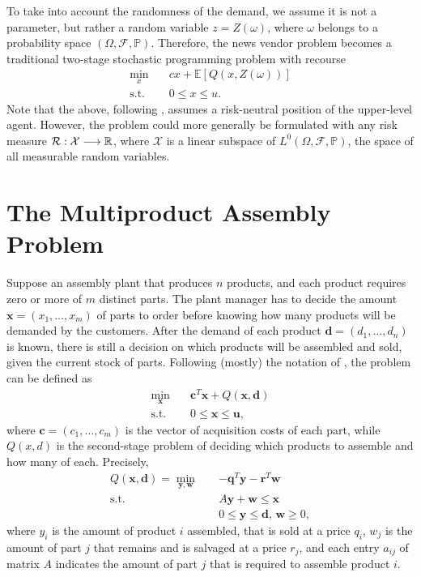 \documentclass[twoside,11pt]{article}
\begin{document}
To take into account the randomness of the demand, we assume it is not a parameter, but rather a random variable $z=Z(\omega)$, where $\omega$ belongs to a probability space $(\Omega,\mathcal{F},\mathbb{P})$.
Therefore, the news vendor problem becomes a traditional two-stage stochastic programming problem with recourse
\begin{align*}
    \min_{x} \quad & cx + \mathbb{E}\left[ Q(x,Z(\omega)) \right]  \\
    \textrm{s.t.} \quad & 0\le x\le u
.\end{align*}
Note that the above, following \citet{birgeIntroductionStochasticProgramming2011}, assumes a risk-neutral position of the upper-level agent.
However, the problem could more generally be formulated with any risk measure $\mathcal{R}: \mathcal{X} \longrightarrow \mathbb{R}$, where $\mathcal{X}$ is a linear subspace of $L^{0}(\Omega, \mathcal{F},\mathbb{P})$, the space of all measurable random variables.


\section*{The Multiproduct Assembly Problem}

Suppose an assembly plant that produces $n$ products, and each product requires zero or more of $m$ distinct parts.
The plant manager has to decide the amount $\bm{x}=(x_1,\ldots,x_{m})$ of parts to order before knowing how many products will be demanded by the customers.
After the demand of each product $\bm{d}=(d_1,\ldots,d_n)$ is known, there is still a decision on which products will be assembled and sold, given the current stock of parts.
Following (mostly) the notation of \citet{shapiroLecturesStochasticProgramming2009}, the problem can be defined as
\begin{align*}
    \min_{\bm{x}} \quad & \bm{c}^{T} \bm{x} + Q(\bm{x}, \bm{d}) \\
    \textrm{s.t.} \quad & 0 \le \bm{x} \le \bm{u}
,\end{align*}
where $\bm{c}=(c_1,\ldots,c_m)$ is the vector of acquisition costs of each part, while $Q(x,d)$ is the second-stage problem of deciding which products to assemble and how many of each.
Precisely,
\begin{align*}
    Q(\bm{x},\bm{d}) = \min_{\bm{y},\bm{w}} \quad & -\bm{q}^{T} \bm{y} - \bm{r}^{T}\bm{w} \\
    \textrm{s.t.} \quad & A\bm{y} + \bm{w} \le \bm{x} \\
      & 0 \le \bm{y} \le \bm{d}, \, \bm{w} \ge 0
,\end{align*}
where $y_i$ is the amount of product $i$ assembled, that is sold at a price $q_i$, $w_j$ is the amount of part $j$ that remains and is salvaged at a price $r_j$, and each entry $a_{ij}$ of matrix $A$ indicates the amount of part $j$ that is required to assemble product $i$.
\end{document}
